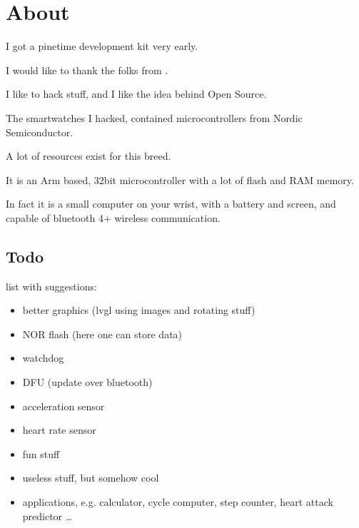 \documentclass[letterpaper,10pt,english]{sphinxmanual}
\begin{document}
\chapter{About}
\label{\detokenize{about:about}}\label{\detokenize{about::doc}}
I got a pinetime development kit very early.

I would like to thank the folks from .

I like to hack stuff, and I like the idea behind Open Source.

The smartwatches I hacked, contained microcontrollers from Nordic Semiconductor.

A lot of resources exist for this breed.

It is an Arm based, 32bit microcontroller with a lot of flash and RAM memory.

In fact it is a small computer on your wrist, with a battery and screen, and capable of bluetooth 4+ wireless communication.

\begin{sphinxVerbatim}[commandchars=\\\{\}]
        
           
\end{sphinxVerbatim}


\section{Todo}
\label{\detokenize{about:todo}}
list with suggestions:
\begin{itemize}
\item {} 
better graphics (lvgl using images and rotating stuff)

\item {} 
NOR flash (here one can store data)

\item {} 
watchdog

\item {} 
DFU (update over bluetooth)

\item {} 
acceleration sensor

\item {} 
heart rate sensor

\item {} 
fun stuff

\item {} 
useless stuff, but somehow cool

\item {} 
applications, e.g. calculator, cycle computer, step counter, heart attack predictor …

\end{itemize}
\end{document}
